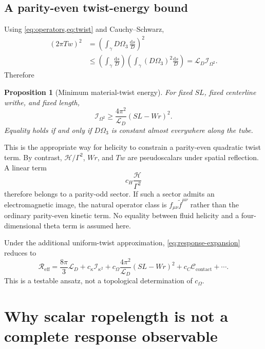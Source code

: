 \documentclass[aps,pre,preprint,notitlepage,nofootinbib,superscriptaddress]{revtex4-2}
\newcommand{\dd}{\mathrm d}
\newcommand{\calH}{\mathcal H}
\newcommand{\calL}{\mathcal L}
\newcommand{\calI}{\mathcal I}
\newcommand{\calC}{\mathcal C}
\newcommand{\Reff}{\mathscr R_{\mathrm{eff}}}
\newtheorem{proposition}{Proposition}
\begin{document}
\subsection{A parity-even twist-energy bound}

Using \cref{eq:operators,eq:twist} and Cauchy--Schwarz,
\begin{align}
  (2\pi Tw)^2
  &=\left(\int_\gamma D\Omega_3\,\frac{\dd s}{D}\right)^2\nonumber\\
  &\le \left(\int_\gamma\frac{\dd s}{D}\right)
       \left(\int_\gamma(D\Omega_3)^2\frac{\dd s}{D}\right)
   =\calL_D\calI_{\Omega^2}.
\end{align}
Therefore
\begin{proposition}[Minimum material-twist energy]
For fixed $SL$, fixed centerline writhe, and fixed length,
\begin{equation}
  \boxed{
  \calI_{\Omega^2}\ge
  \frac{4\pi^2}{\calL_D}(SL-Wr)^2.}
  \label{eq:twist-bound}
\end{equation}
Equality holds if and only if $D\Omega_3$ is constant almost everywhere along the tube.
\end{proposition}

This is the appropriate way for helicity to constrain a parity-even quadratic twist term.  By contrast, $\calH/\Gamma^2$, $Wr$, and $Tw$ are pseudoscalars under spatial reflection.  A linear term
\begin{equation}
  c_H\frac{\calH}{\Gamma^2}
\end{equation}
therefore belongs to a parity-odd sector.  If such a sector admits an electromagnetic image, the natural operator class is $f_{\mu\nu}\widetilde f^{\mu\nu}$ rather than the ordinary parity-even kinetic term.  No equality between fluid helicity and a four-dimensional theta term is assumed here.

Under the additional uniform-twist approximation, \cref{eq:response-expansion} reduces to
\begin{equation}
  \Reff=\frac{8\pi}{3}\calL_D
  +c_\kappa\calI_{\kappa^2}
  +c_\Omega\frac{4\pi^2}{\calL_D}(SL-Wr)^2
  +c_C\calC_{\mathrm{contact}}+\cdots.
  \label{eq:uniform-twist-response}
\end{equation}
This is a testable ansatz, not a topological determination of $c_\Omega$.

\section{Why scalar ropelength is not a complete response observable}
\label{sec:ropelength-data}
\end{document}
